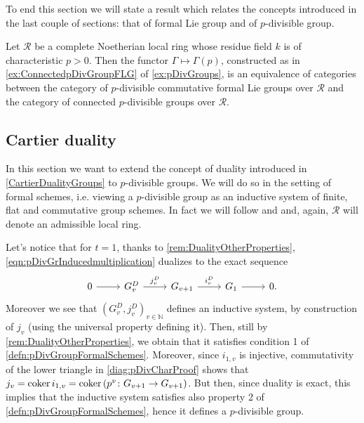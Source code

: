 \noindent
To end this section we will state a result
which relates the concepts introduced in the last couple of sections:
that of formal Lie group and of $p$-divisible group.


\begin{prop}\label{prop:equivCatConnpDivGr}
	Let $\mathscr{R}$ be a complete Noetherian local ring whose residue field $k$
	is of characteristic $p > 0$.
	Then the functor $\Gamma \mapsto \Gamma(p)$, constructed as in \cref{ex:ConnectedpDivGroupFLG}
	of \cref{ex:pDivGroups},
	is an equivalence of categories
	between the category of $p$-divisible commutative formal Lie groups over $\mathscr{R}$
	and the category of connected $p$-divisible groups over $\mathscr{R}$.
\end{prop}



\subsection{Cartier duality}%
In this section we want to extend the concept of duality introduced in \cref{CartierDualityGroups}
to $p$-divisible groups.
We will do so in the setting of formal schemes,
i.e$.$ viewing a $p$-divisible group as an inductive system of finite,
flat and commutative group schemes.
In fact we will follow \cite[\S6]{Shatz} and \cite[\S2.3]{TatePC} and,
again, \(\mathscr{R}\) will denote an admissible local ring.


\begin{rem}[]\label{rem:DualInductiveSystem}
	Let's notice that for $t = 1$, thanks to \cref{rem:DualityOtherProperties}, 
	\cref{eqn:pDivGrInducedmultiplication} dualizes to the exact sequence
	\begin{equation*}
	\begin{tikzcd}
		0 \arrow[r, "", rightarrow] &
		G_v^D \arrow[r, "j_v^D", rightarrow] &
		G_{v+1} \arrow[r, "i_v^D", rightarrow] &
		G_1 \arrow[r, "", rightarrow] &
		0
	.\end{tikzcd}
	\end{equation*}
	Moreover we see that $\left( G_v^D, j_v^D \right)_{v \in \mathbb{N}}$
	defines an inductive system, by construction of $j_v$ (using the universal property
	defining it).
	Then, still by \cref{rem:DualityOtherProperties}, we obtain that it satisfies condition 1
	of \cref{defn:pDivGroupFormalSchemes}.
	Moreover, since $i_{1,v}$ is injective,
	commutativity of the lower triangle in \cref{diag:pDivCharProof}
	shows that $j_v = \operatorname{coker} i_{1,v} = \operatorname{coker} \left( p^v\colon G_{v+1} \to G_{v+1} \right)$.
	But then, since duality is exact, this implies that the inductive system
	satisfies also property 2 of \cref{defn:pDivGroupFormalSchemes},
	hence it defines a $p$-divisible group.
\end{rem}



